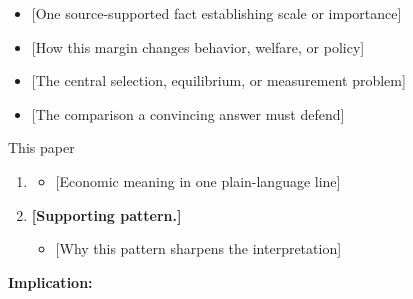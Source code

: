 \documentclass[11pt, aspectratio=169]{beamer}
\title[\PaperShortTitle]{\PaperTitle}
\author[\AuthorShort]{\TitleAuthorBlock}
\institute{\TitleAffiliationBlock}
\date[\VenueShort]{\VenueDate}
\begin{document}
\begin{frame}[plain]
  \titlepage
\end{frame}
\addtocounter{framenumber}{-1}

\begin{frame}[t]{\KeyQuestion}
  \medskip
  \begin{itemize}\setlength{\itemsep}{0.55em}
    \item {[One source-supported fact establishing scale or importance]}
    \item {[How this margin changes behavior, welfare, or policy]}
  \end{itemize}

  \medskip
  \begin{itemize}\setlength{\itemsep}{0.55em}
    \item {[The central selection, equilibrium, or measurement problem]}
    \item {[The comparison a convincing answer must defend]}
  \end{itemize}
  \medskip
\end{frame}

\begin{frame}{This paper}
  \begin{enumerate}\setlength{\itemsep}{0.78em}
    \item {} \ResultHeadlineSlide
      \begin{itemize}
        \item {[Economic meaning in one plain-language line]}
      \end{itemize}
    \item \textbf{[Supporting pattern.]} \ResultSupportSlide
      \begin{itemize}
        \item {[Why this pattern sharpens the interpretation]}
      \end{itemize}
  \end{enumerate}
  \medskip
  \textbf{Implication:} \ResultImplicationSlide
\end{frame}
\end{document}
